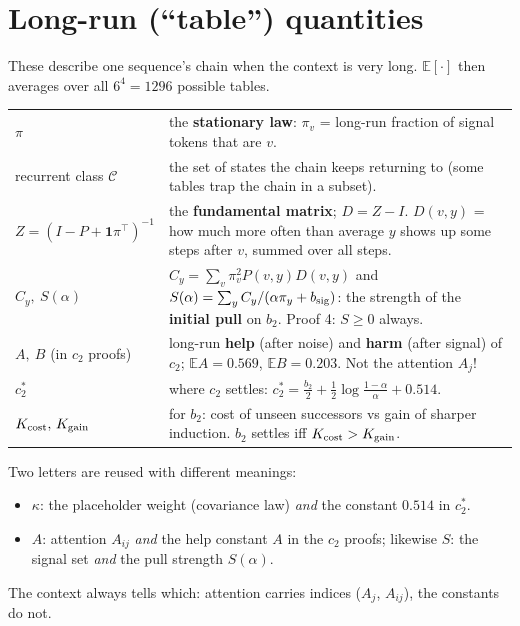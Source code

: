 \documentclass[11pt]{article}
\newcommand{\1}{\mathbf{1}}
\begin{document}
\section{Long-run (``table'') quantities}
These describe one sequence's chain when the context is very long. $\mathbb E[\cdot]$ then averages over all
$6^4=1296$ possible tables.
\begin{center}
\begin{tabular}{>{\raggedright}p{2.6cm}p{11.8cm}}
\toprule
$\pi$ & the \textbf{stationary law}: $\pi_v$ = long-run fraction of signal tokens that are $v$.\\
recurrent class $\mathcal C$ & the set of states the chain keeps returning to (some tables trap the chain in a subset).\\
$Z=(I-P+\1\pi^\top)^{-1}$ & the \textbf{fundamental matrix}; $D=Z-I$. $D(v,y)$ = how much more often than average $y$ shows up some steps after $v$, summed over all steps.\\
$C_y,\ S(\alpha)$ & $C_y=\sum_v\pi_v^2P(v,y)D(v,y)$ and $S(\alpha)=\sum_y C_y/(\alpha\pi_y+b_{\rm sig})$: the strength of the \textbf{initial pull} on $b_2$. Proof 4: $S\ge0$ always.\\
$A,\ B$ (in $c_2$ proofs) & long-run \textbf{help} (after noise) and \textbf{harm} (after signal) of $c_2$; $\mathbb E A=0.569$, $\mathbb E B=0.203$. Not the attention $A_j$!\\
$c_2^\ast$ & where $c_2$ settles: $c_2^\ast=\tfrac{b_2}2+\tfrac12\log\tfrac{1-\alpha}{\alpha}+0.514$.\\
$K_{\rm cost},\,K_{\rm gain}$ & for $b_2$: cost of unseen successors vs gain of sharper induction. $b_2$ settles iff $K_{\rm cost}>K_{\rm gain}$.\\
\bottomrule
\end{tabular}
\end{center}

\begin{warn}
Two letters are reused with different meanings:
\begin{itemize}
\item $\kappa$: the placeholder weight (covariance law) \emph{and} the constant $0.514$ in $c_2^\ast$.
\item $A$: attention $A_{ij}$ \emph{and} the help constant $A$ in the $c_2$ proofs; likewise $S$: the signal set \emph{and} the pull strength $S(\alpha)$.
\end{itemize}
The context always tells which: attention carries indices ($A_j$, $A_{ij}$), the constants do not.
\end{warn}
\end{document}
